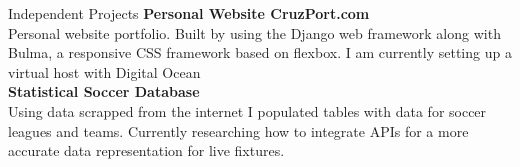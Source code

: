 \documentclass[10pt]{resume} %
\newcommand{\tab}[1]{\hspace{.2667\textwidth}\rlap{#1}}
\newcommand{\itab}[1]{\hspace{0em}\rlap{#1}}
\begin{document}
\begin{rSection}{Independent Projects}
{\bf Personal Website CruzPort.com}
\\ Personal website portfolio. Built by using the Django web framework along with Bulma, a responsive CSS framework based on flexbox. I am currently setting 
up a virtual host with Digital Ocean
\\ {\bf Statistical Soccer Database}
\\ Using data scrapped from the internet I populated tables with data for soccer leagues and teams. Currently researching how to integrate APIs for a more accurate data representation for live fixtures.

\end{rSection}
\end{document}
